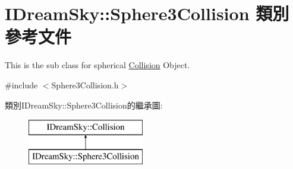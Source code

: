 \hypertarget{class_i_dream_sky_1_1_sphere3_collision}{}\section{I\+Dream\+Sky\+:\+:Sphere3\+Collision 類別 參考文件}
\label{class_i_dream_sky_1_1_sphere3_collision}


This is the sub class for spherical \hyperlink{class_i_dream_sky_1_1_collision}{Collision} Object.  




{\ttfamily \#include $<$Sphere3\+Collision.\+h$>$}

類別\+I\+Dream\+Sky\+:\+:Sphere3\+Collision的繼承圖\+:\begin{figure}[H]
\begin{center}
\leavevmode
\includegraphics[height=2.000000cm]{class_i_dream_sky_1_1_sphere3_collision}
\end{center}
\end{figure}
